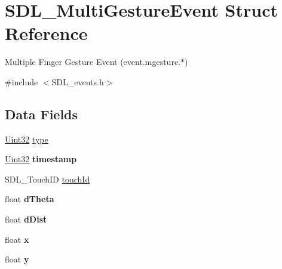 \hypertarget{struct_s_d_l___multi_gesture_event}{}\section{S\+D\+L\+\_\+\+Multi\+Gesture\+Event Struct Reference}
\label{struct_s_d_l___multi_gesture_event}


Multiple Finger Gesture Event (event.\+mgesture.$\ast$)  




{\ttfamily \#include $<$S\+D\+L\+\_\+events.\+h$>$}

\subsection*{Data Fields}
\begin{DoxyCompactItemize}
\item 
\hyperlink{_s_d_l__stdinc_8h_add440eff171ea5f55cb00c4a9ab8672d}{Uint32} \hyperlink{struct_s_d_l___multi_gesture_event_aa40a9b05c3154032b9f2d7220e9f08dc}{type}
\item 
\hyperlink{_s_d_l__stdinc_8h_add440eff171ea5f55cb00c4a9ab8672d}{Uint32} {\bfseries timestamp}\hypertarget{struct_s_d_l___multi_gesture_event_abf1ed7edeab81db9c05d899836a44a2f}{}\label{struct_s_d_l___multi_gesture_event_abf1ed7edeab81db9c05d899836a44a2f}

\item 
S\+D\+L\+\_\+\+Touch\+ID \hyperlink{struct_s_d_l___multi_gesture_event_a35f615f6a1333a7d89297b58ed1e9bbb}{touch\+Id}
\item 
float {\bfseries d\+Theta}\hypertarget{struct_s_d_l___multi_gesture_event_ab6d40c806093b9926eeb9d53f6d91a96}{}\label{struct_s_d_l___multi_gesture_event_ab6d40c806093b9926eeb9d53f6d91a96}

\item 
float {\bfseries d\+Dist}\hypertarget{struct_s_d_l___multi_gesture_event_aef9b0b4a812d2fa06eaa02174dfa8e71}{}\label{struct_s_d_l___multi_gesture_event_aef9b0b4a812d2fa06eaa02174dfa8e71}

\item 
float {\bfseries x}\hypertarget{struct_s_d_l___multi_gesture_event_ad0da36b2558901e21e7a30f6c227a45e}{}\label{struct_s_d_l___multi_gesture_event_ad0da36b2558901e21e7a30f6c227a45e}

\item 
float {\bfseries y}\hypertarget{struct_s_d_l___multi_gesture_event_aa4f0d3eebc3c443f9be81bf48561a217}{}\label{struct_s_d_l___multi_gesture_event_aa4f0d3eebc3c443f9be81bf48561a217}


\end{DoxyCompactItemize}
